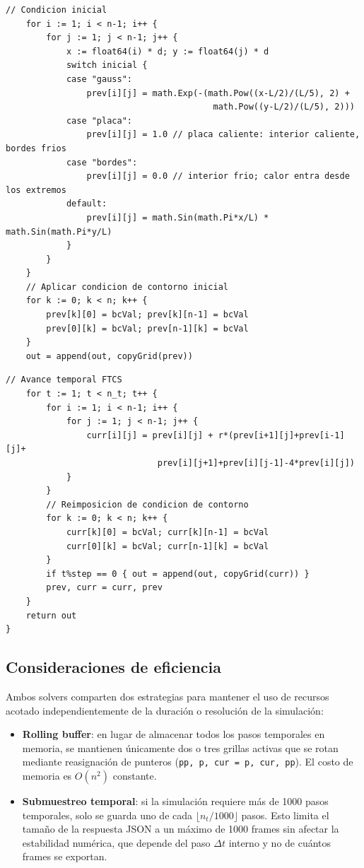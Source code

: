 \documentclass[12pt, a4paper]{article}
\begin{document}
\begin{lstlisting}[style=golang, caption={Condición inicial y contorno de la placa térmica}]
    // Condicion inicial
    for i := 1; i < n-1; i++ {
        for j := 1; j < n-1; j++ {
            x := float64(i) * d; y := float64(j) * d
            switch inicial {
            case "gauss":
                prev[i][j] = math.Exp(-(math.Pow((x-L/2)/(L/5), 2) +
                                         math.Pow((y-L/2)/(L/5), 2)))
            case "placa":
                prev[i][j] = 1.0 // placa caliente: interior caliente, bordes frios
            case "bordes":
                prev[i][j] = 0.0 // interior frio; calor entra desde los extremos
            default:
                prev[i][j] = math.Sin(math.Pi*x/L) * math.Sin(math.Pi*y/L)
            }
        }
    }
    // Aplicar condicion de contorno inicial
    for k := 0; k < n; k++ {
        prev[k][0] = bcVal; prev[k][n-1] = bcVal
        prev[0][k] = bcVal; prev[n-1][k] = bcVal
    }
    out = append(out, copyGrid(prev))
\end{lstlisting}

\begin{lstlisting}[style=golang, caption={Avance temporal FTCS de la ecuación de calor}]
    // Avance temporal FTCS
    for t := 1; t < n_t; t++ {
        for i := 1; i < n-1; i++ {
            for j := 1; j < n-1; j++ {
                curr[i][j] = prev[i][j] + r*(prev[i+1][j]+prev[i-1][j]+
                              prev[i][j+1]+prev[i][j-1]-4*prev[i][j])
            }
        }
        // Reimposicion de condicion de contorno
        for k := 0; k < n; k++ {
            curr[k][0] = bcVal; curr[k][n-1] = bcVal
            curr[0][k] = bcVal; curr[n-1][k] = bcVal
        }
        if t%step == 0 { out = append(out, copyGrid(curr)) }
        prev, curr = curr, prev
    }
    return out
}
\end{lstlisting}

\subsection{Consideraciones de eficiencia}

Ambos solvers comparten dos estrategias para mantener el uso de recursos acotado
independientemente de la duración o resolución de la simulación:

\begin{itemize}
    \item \textbf{Rolling buffer}: en lugar de almacenar todos los pasos temporales en
    memoria, se mantienen únicamente dos o tres grillas activas que se rotan mediante
    reasignación de punteros (\texttt{pp, p, cur = p, cur, pp}). El costo de memoria
    es $O(n^2)$ constante.

    \item \textbf{Submuestreo temporal}: si la simulación requiere más de 1000 pasos
    temporales, solo se guarda uno de cada $\lfloor n_t / 1000 \rfloor$ pasos. Esto
    limita el tamaño de la respuesta JSON a un máximo de 1000 frames sin afectar la
    estabilidad numérica, que depende del paso $\Delta t$ interno y no de cuántos
    frames se exportan.
\end{itemize}
\end{document}
